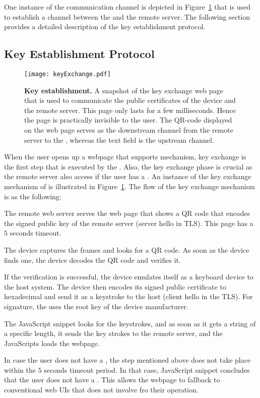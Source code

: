 One instance of the communication channel is depicted in Figure~\ref{fig:keyExchange} that is used to establish a \tls channel between the \device and the remote server. The following section provides a detailed description of the key establishment protocol.


\subsection{Key Establishment Protocol}
\label{sec:systemDesign:keyEstablishment}

\begin{figure}[t]
\centering
\texttt{[image: keyExchange.pdf]}
\caption{\textbf{Key establishment.} A snapshot of the key exchange web page that is used to communicate the public certificates of the device and the remote server. This page only lasts for a few milliseconds. Hence the page is practically invisible to the user. The QR-code displayed on the web page serves as the downstream channel from the remote server to the \device, whereas the text field is the upstream channel.}
\label{fig:keyExchange}
\centering
\end{figure}

When the user opens up a webpage that supports \name mechanism, key exchange is the first step that is executed by the \device. Also, the key exchange phase is crucial as the remote server also access if the user has a \device. An instance of the key exchange mechanism of \name is illustrated in Figure~\ref{fig:keyExchange}. The flow of the key exchange mechanism is as the following:

\begin{mylist}
  \item The remote web server serves the web page that shows a QR code that encodes the signed public key of the remote server (server hello in TLS). This page has a $5$ seconds timeout.
  \item The device captures the frames and looks for a QR code. As soon as the device finds one, the device decodes the QR code and verifies it.
  \item If the verification is successful, the device emulates itself as a keyboard device to the host system. The device then encodes its signed public certificate to hexadecimal and send it as a keystroke to the host (client hello in the TLS). For signature, the \device uses the root key of the device manufacturer.
  \item The \name  JavaScript snippet looks for the keystrokes, and as soon as it gets a string of a specific length, it sends the key strokes to the remote server, and the \name JavaScripts loads the webpage.
  \item In case the user does not have a \device, the step mentioned above does not take place within the $5$ seconds timeout period. In that case, \name JavaScript snippet concludes that the user does not have a \device. This allows the webpage to fallback to conventional web UIs that does not involve \device fro their operation.
\end{mylist}

